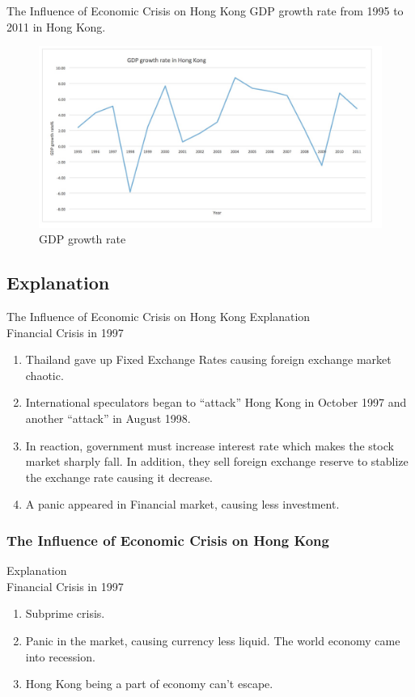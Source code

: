 \documentclass[slidestop,uncompress,mathsans, 12pt]{beamer}
\begin{document}
\begin{frame}{The Influence of Economic Crisis on Hong Kong }
GDP growth rate from 1995 to 2011 in Hong Kong.\\
\bigskip
\begin{figure}[h]
\raggedleft
\includegraphics[width=1\textwidth]{hk3.jpg}
\caption{GDP growth rate}
\label{threadsVsSync}
\end{figure}
\end{frame}

\subsection{Explanation}
\begin{frame}{The Influence of Economic Crisis on Hong Kong }
Explanation\\
\bigskip
\alert{Financial Crisis in 1997}
\bigskip

\begin{enumerate}[i]
\pause\item Thailand gave up Fixed Exchange Rates causing foreign exchange market chaotic.
\bigskip
\pause\item International speculators began to “attack” Hong Kong in October 1997 and another “attack” in August 1998.
\bigskip
\pause\item In reaction, government must increase interest rate which makes the stock market sharply fall. In addition, they sell foreign exchange reserve to stablize the exchange rate causing it decrease.
\bigskip
\pause\item A panic appeared in Financial market, causing less investment.
\end{enumerate}

\end{frame}

\begin{frame}
\frametitle{The Influence of Economic Crisis on Hong Kong }
Explanation\\
\bigskip
\alert{Financial Crisis in 1997}
\bigskip
\begin{enumerate}[I]
\item <+-| alert@+> Subprime crisis. 
\bigskip
\item <+-| alert@+> Panic in the market, causing currency less liquid. The world economy came into recession.
\bigskip
\item <+-| alert@+> Hong Kong being a part of economy can't escape. 

\bigskip

\end{enumerate}
\end{frame}
\end{document}

